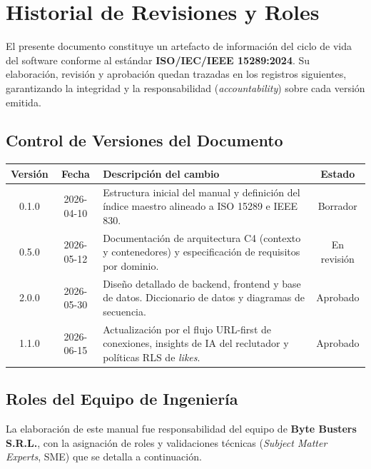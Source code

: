 \chapter*{Historial de Revisiones y Roles}

El presente documento constituye un artefacto de información del ciclo de vida del
software conforme al estándar \textbf{ISO/IEC/IEEE 15289:2024}. Su elaboración,
revisión y aprobación quedan trazadas en los registros siguientes, garantizando la
integridad y la responsabilidad (\textit{accountability}) sobre cada versión emitida.

\section*{Control de Versiones del Documento}

\vspace{0.2cm}
\noindent
\renewcommand{\arraystretch}{1.4}
\fontsize{9}{10.8}\selectfont\sffamily
\begin{tabularx}{\textwidth}{|c|c|X|c|}
\hline
\rowcolor{headerTabla}
\textbf{Versión} & \textbf{Fecha} & \textbf{Descripción del cambio} & \textbf{Estado} \\
\hline
0.1.0 & 2026-04-10 & Estructura inicial del manual y definición del índice maestro alineado a ISO 15289 e IEEE 830. & Borrador \\
\hline
\rowcolor{grisTecnico}
0.5.0 & 2026-05-12 & Documentación de arquitectura C4 (contexto y contenedores) y especificación de requisitos por dominio. & En revisión \\
\hline
2.0.0 & 2026-05-30 & Diseño detallado de backend, frontend y base de datos. Diccionario de datos y diagramas de secuencia. & Aprobado \\
\hline
\rowcolor{grisTecnico}
1.1.0 & 2026-06-15 & Actualización por el flujo URL-first de conexiones, insights de IA del reclutador y políticas RLS de \textit{likes}. & Aprobado \\
\hline
\end{tabularx}

\vspace{0.6cm}

\clearpage
\section{Roles del Equipo de Ingeniería}
La elaboración de este manual fue responsabilidad del equipo de \textbf{Byte Busters
S.R.L.}, con la asignación de roles y validaciones técnicas (\textit{Subject Matter
Experts}, SME) que se detalla a continuación.

